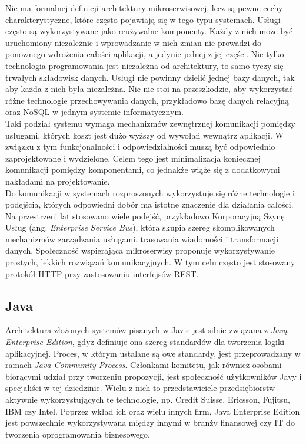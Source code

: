 \documentclass[12pt,twoside]{article}
\begin{document}
Nie ma formalnej definicji architektury mikroserwisowej, lecz są pewne
cechy charakterystyczne, które często pojawiają się w tego typu
systemach. Usługi często są wykorzystywane jako reużywalne komponenty.
Każdy z nich może być uruchomiony niezależnie i wprowadzanie w nich
zmian nie prowadzi do ponownego wdrożenia całości aplikacji, a jedynie
jednej z jej części. Nie tylko technologia programowania jest niezależna
od architektury, to samo tyczy się trwałych składowisk danych. Usługi
nie powinny dzielić jednej bazy danych, tak aby każda z nich była
niezależna. Nic nie stoi na przeszkodzie, aby wykorzystać różne
technologie przechowywania danych, przykładowo bazę danych relacyjną
oraz NoSQL w jednym systemie informatycznym.\\
Taki podział systemu wymaga mechanizmów zewnętrznej komunikacji pomiędzy
usługami, których koszt jest dużo wyższy od wywołań wewnątrz aplikacji.
W związku z tym funkcjonalności i odpowiedzialności muszą być
odpowiednio zaprojektowane i wydzielone. Celem tego jest minimalizacja
koniecznej komunikacji pomiędzy komponentami, co jednakże wiąże się z
dodatkowymi nakładami na projektowanie.\\
Do komunikacji w systemach rozproszonych wykorzystuje się różne
technologie i podejścia, których odpowiedni dobór ma istotne znaczenie
dla działania całości. Na przestrzeni lat stosowano wiele podejść,
przykładowo Korporacyjną Szynę Usług (ang. \emph{Enterprise Service
Bus}), która skupia szereg skomplikowanych mechanizmów zarządzania
usługami, trasowania wiadomości i transformacji danych. Społeczność
wspierająca mikroserwisy proponuje wykorzystywanie prostych, lekkich
rozwiązań komunikacyjnych. W tym celu często jest stosowany protokół
HTTP przy zastosowaniu interfejsów REST.
\autocite{fowler2014microservice, fowler2015microservices, newman2015building}

\subsection{Java}\label{architektura---java}

Architektura złożonych systemów pisanych w Javie jest silnie związana z
\emph{Javą Enterprise Edition}, gdyż definiuje ona szereg standardów dla
tworzenia logiki aplikacyjnej. Proces, w którym ustalane są owe
standardy, jest przeprowadzany w ramach \emph{Java Community Process}.
Członkami komitetu, jak również osobami biorącymi udział przy tworzeniu
propozycji, jest społeczność użytkowników Javy i specjaliści w tej
dziedzinie. Wielu z nich to przedstawiciele przedsiębiorstw aktywnie
wykorzystujących te technologie, np. Credit Suisse, Ericsson, Fujitsu,
IBM czy Intel\autocite{jcp2015}. Poprzez wkład ich oraz wielu innych
firm, Java Enterprise Edition jest powszechnie wykorzystywana między
innymi w branży finansowej czy IT do tworzenia oprogramowania
biznesowego.
\end{document}

